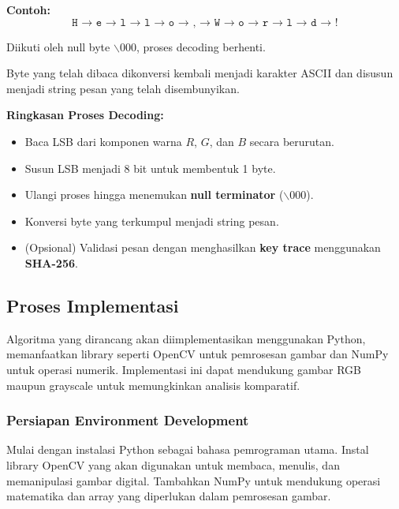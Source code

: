 \documentclass{ittelkom}
\begin{document}
\begin{enumerate}
\begin{enumerate}
                    \noindent
                    \textbf{Contoh:}
                    \[
                        \texttt{H → e → l → l → o → , → W → o → r → l → d → !}
                    \]

                    Diikuti oleh null byte $\backslash 000$, proses decoding berhenti.

                    Byte yang telah dibaca dikonversi kembali menjadi karakter ASCII dan disusun
                    menjadi string pesan yang telah disembunyikan.

          \end{enumerate}

          \noindent
          \textbf{Ringkasan Proses Decoding:}
          \begin{itemize}
              \item Baca LSB dari komponen warna $R$, $G$, dan $B$ secara berurutan.
              \item Susun LSB menjadi 8 bit untuk membentuk 1 byte.
              \item Ulangi proses hingga menemukan \textbf{null terminator} ($\backslash 000$).
              \item Konversi byte yang terkumpul menjadi string pesan.
              \item (Opsional) Validasi pesan dengan menghasilkan \textbf{key trace} menggunakan \textbf{SHA-256}.
          \end{itemize}
\end{enumerate}

\subsection{Proses Implementasi}

Algoritma yang dirancang akan diimplementasikan menggunakan Python,
memanfaatkan library seperti OpenCV untuk pemrosesan gambar dan NumPy untuk
operasi numerik. Implementasi ini dapat mendukung gambar RGB maupun grayscale
untuk memungkinkan analisis komparatif.

\subsubsection{Persiapan Environment Development}

Mulai dengan instalasi Python sebagai bahasa pemrograman utama. Instal library
OpenCV yang akan digunakan untuk membaca, menulis, dan memanipulasi gambar
digital. Tambahkan NumPy untuk mendukung operasi matematika dan array yang
diperlukan dalam pemrosesan gambar.
\end{document}

